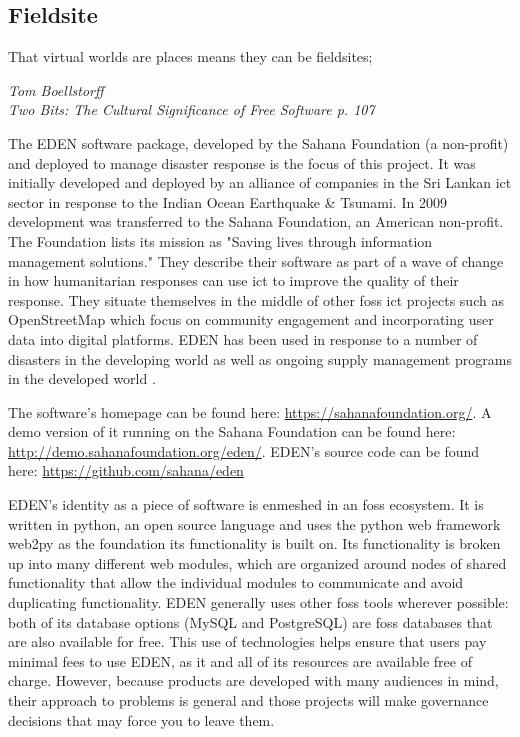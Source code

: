 \documentclass[a4paper,man,natbib]{apa6}
\begin{document}
   \subsection*{Fieldsite}
   \epigraph{That virtual worlds are places means they can be fieldsites;}{\textit{Tom Boellstorff \\ Two Bits: The Cultural Significance of Free Software p. 107}}

   The EDEN software package, developed by the Sahana Foundation (a non-profit) and deployed to manage disaster response is the focus of this project. It was initially developed and deployed by an alliance of companies in the Sri Lankan \acrfull{ict} sector in response to the Indian Ocean Earthquake \& Tsunami. In 2009 development was transferred to the Sahana Foundation, an American non-profit. The Foundation lists its mission as "Saving lives through information management solutions." They describe their software as part of a wave of change in how humanitarian responses can use \acrshort{ict} to improve the quality of their response. They situate themselves in the middle of other \acrfull{foss} \acrshort{ict} projects such as \Gls{OpenStreetMap} which focus on community engagement and incorporating user data into digital platforms. EDEN has been used in response to a number of disasters in the developing world as well as ongoing supply management programs in the developed world \citep{Sahana_Foundation_undated-hl}.

   The software's homepage can be found here: \url{https://sahanafoundation.org/}. \linebreak 
   A demo version of it running on the Sahana Foundation can be found here: \url{http://demo.sahanafoundation.org/eden/}. \linebreak 
   EDEN's source code can be found here: \url{https://github.com/sahana/eden} \linebreak 

   EDEN's identity as a piece of software is enmeshed in an \acrshort{foss} ecosystem. It is written in \Gls{python}, an open source language and uses the \Gls{python} \gls{web framework} web2py as the foundation its functionality is built on. Its functionality is broken up into many different web modules, which are organized around nodes of shared functionality that allow the individual modules to communicate and avoid duplicating functionality. EDEN generally uses other \acrshort{foss} tools wherever possible: both of its database options (\Gls{MySQL} and \Gls{PostgreSQL}) are \acrshort{foss} databases that are also available for free. This use of  technologies helps ensure that users pay minimal fees to use EDEN, as it and all of its resources are available free of charge. However, because  products are developed with many audiences in mind, their approach to problems is general and those projects will make governance decisions that may force you to leave them.
\end{document}
